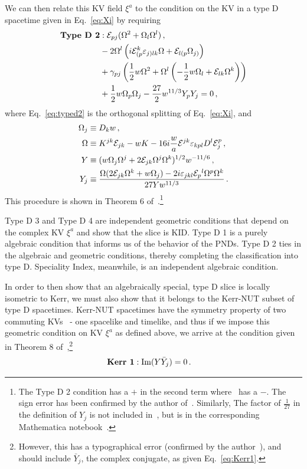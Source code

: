 We can then relate this KV field $\xi^a$ to the condition on the KV in a type D spacetime given in Eq.~\eqref{eq:Xi} by requiring
\begin{align}
\label{eq:typed2}
\textrm{\textbf{Type D 2}}&: \mathcal E_{pj}(\Omega^2 + \Omega_l \Omega^l) \,, \\
&- 2  \Omega^l\left ( i \mathcal E_{(p}^k \varepsilon_{j)lk} \Omega + \mathcal E_{l(p} \Omega_{j)}\right) \nonumber \\
& + \gamma_{pj} \left(\frac{1}{2} w \Omega^2 + \Omega^l \left(-\frac{1}{2} w \Omega_l + \mathcal E_{lk} \Omega^k  \right) \right) \nonumber \\
& + \frac{1}{2} w \Omega_p \Omega_j  - \dfrac{27}{2} w^{11/3} Y_p Y_j = 0 \nonumber \,, 
\end{align}
where Eq.~\eqref{eq:typed2} is the orthogonal splitting of Eq.~\eqref{eq:Xi}, and 
\begin{align}
\label{eq:definitions}
\Omega_j &\equiv D_k w \,, \\
\Omega &\equiv K^{jk} \mathcal E_{jk} - w K - 16 i \dfrac{w}{a} \mathcal E^{jk} \varepsilon_{kpl} D^l \mathcal E_j^p \nonumber \,, \\
Y &\equiv (w \Omega_j \Omega^j + 2 \mathcal E_{jk} \Omega^j \Omega^k)^{1/2} w^{-11/6} \nonumber \,, \\
Y_j &\equiv \dfrac{\Omega(2 \mathcal E_{jk} \Omega^k + w \Omega_j) - 2i \varepsilon_{jkl}\mathcal E_p{}^l\Omega^p\Omega^k }{27 Y w^{11/3}} \nonumber \,.
\end{align}
This procedure is shown in Theorem 6 of~\cite{lobo16}.\footnote{The Type D 2 condition has a $+$ in the second term where~\cite{lobo16}  has a $-$. The sign error has been confirmed by the author of~\cite{lobo16}. Similarly, The factor of $\frac{1}{27}$ in the definition of $Y_j$ is not included in~\cite{lobo16}, but is in the corresponding Mathematica notebook~\cite{loboprivate}.} 

Type D 3 and Type D 4 are independent geometric conditions that depend on the complex KV $\xi^{a}$ and show that the slice is KID. Type D 1 is a purely algebraic condition that informs us of the behavior of the PNDs. Type D 2 ties in the algebraic and geometric conditions, thereby completing the classification into type D. Speciality Index, meanwhile, is an independent algebraic condition. 

In order to then show that an algebraically special, type D slice is locally isometric to Kerr, we must also show that it belongs to the Kerr-NUT subset of type D spacetimes. Kerr-NUT spacetimes have the symmetry property of two commuting KVs~\cite{stephani2009exact} - one spacelike and timelike, and thus if we impose this geometric condition on KV $\xi^a$ as defined above, we arrive at the condition given in Theorem 8 of~\cite{lobo16},\footnote{However, this has a typographical error (confirmed by the author~\cite{loboprivate}), and should include $\bar Y_j$, the complex conjugate, as given Eq.~\eqref{eq:Kerr1}.}
\begin{align}
\textrm{\textbf{Kerr 1}}&: \operatorname{Im}(Y \bar Y_j) = 0\,.
\label{eq:Kerr1}
\end{align}

